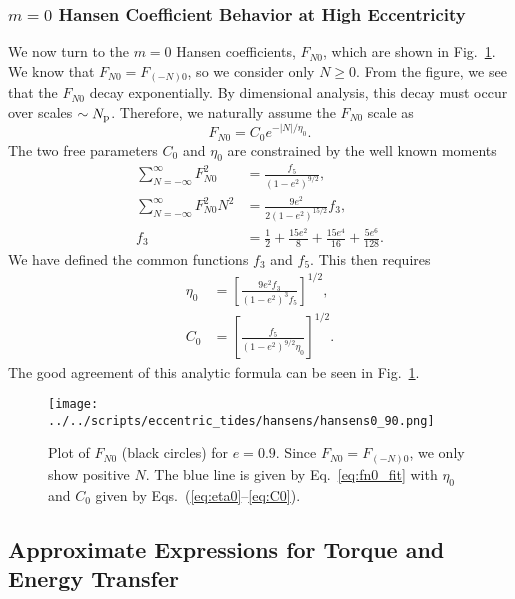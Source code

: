 \documentclass[
        fleqn,
        usenatbib,
    ]{mnras}
\newcommand*{\abs}[1]{\left|#1\right|}
\newcommand*{\p}[1]{\left(#1\right)}
\newcommand*{\s}[1]{\left[#1\right]}
\begin{document}
\subsubsection{$m = 0$ Hansen Coefficient Behavior at High Eccentricity}

We now turn to the $m = 0$ Hansen coefficients, $F_{N0}$, which are shown in
Fig.~\ref{fig:fn0_fit}. We know that $F_{N0} = F_{(-N)0}$, so we consider only
$N \geq 0$. From the figure, we see that the $F_{N0}$ decay exponentially. By
dimensional analysis, this decay must occur over scales $\sim N_{\rm p}$.
Therefore, we naturally assume the $F_{N0}$ scale as
\begin{equation}
    F_{N0} = C_0 e^{-\abs{N} / \eta_0}.\label{eq:fn0_fit}
\end{equation}
The two free parameters $C_0$ and $\eta_0$ are constrained by the well known
moments \citep{hut81}
\begin{align}
    \sum\limits_{N = -\infty}^\infty F_{N0}^2 &= \frac{f_5}{\p{1 - e^2}^{9/2}}
        ,\\
    \sum\limits_{N = -\infty}^\infty F_{N0}^2 N^2
        &= \frac{9e^2}{2\p{1 - e^2}^{15/2}}
            f_3,\\
    f_3 &= \frac{1}{2} + \frac{15e^2}{8} + \frac{15 e^4}{16}
        + \frac{5e^6}{128}.
\end{align}
We have defined the common functions $f_3$ and $f_5$. This then requires
\begin{align}
    \eta_0 &= \s{\frac{9e^2f_3}{\p{1 - e^2}^{3}f_5}}^{1/2},\label{eq:eta0}\\
    C_0 &= \s{\frac{f_5}{\p{1 - e^2}^{9/2}\eta_0}}^{1/2}.\label{eq:C0}
\end{align}
The good agreement of this analytic formula can be seen in
Fig.~\ref{fig:fn0_fit}.

\begin{figure}
    \centering
    \texttt{[image: ../../scripts/eccentric\_tides/hansens/hansens0\_90.png]}
    \caption{Plot of $F_{N0}$ (black circles) for $e = 0.9$. Since $F_{N0} =
    F_{(-N)0}$, we only show positive $N$. The blue line is given by
    Eq.~\eqref{eq:fn0_fit} with $\eta_0$ and $C_0$ given by
    Eqs.~(\ref{eq:eta0}--\ref{eq:C0}).}\label{fig:fn0_fit}
\end{figure}

\subsection{Approximate Expressions for Torque and Energy Transfer}\label{s:eval}
\end{document}
